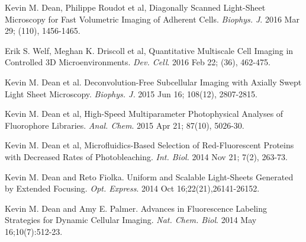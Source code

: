 \begin{etaremune}
\item Kevin M. Dean, Philippe Roudot et al,  Diagonally Scanned Light-Sheet Microscopy for Fast Volumetric Imaging of Adherent Cells.  {\it Biophys. J}.  2016 Mar 29; (110), 1456-1465. 

\item Erik S. Welf, Meghan K. Driscoll et al, Quantitative Multiscale Cell Imaging in Controlled 3D Microenvironments. {\it Dev. Cell}.  2016 Feb 22; (36), 462-475. 

\item Kevin M. Dean et al.  Deconvolution-Free Subcellular Imaging with Axially Swept Light Sheet Microscopy.  {\it Biophys. J.} 2015 Jun 16; 108(12), 2807-2815.

\item Kevin M. Dean et al,  High-Speed Multiparameter Photophysical Analyses  of Fluorophore Libraries. {\it Anal. Chem}.  2015 Apr 21; 87(10), 5026-30.

\item Kevin M. Dean et al, Microfluidics-Based Selection of Red-Fluorescent Proteins with Decreased Rates of Photobleaching.  {\it Int. Biol.}  2014 Nov 21; 7(2), 263-73.

\item Kevin M. Dean and Reto Fiolka.  Uniform and Scalable Light-Sheets Generated by Extended Focusing.  {\it Opt. Express}.  2014  Oct 16;22(21),26141-26152.

\item Kevin M. Dean and Amy E. Palmer.  Advances in Fluorescence Labeling Strategies for Dynamic Cellular Imaging.   {\it Nat. Chem. Biol}. 2014 May 16;10(7):512-23. 


\end{etaremune}
